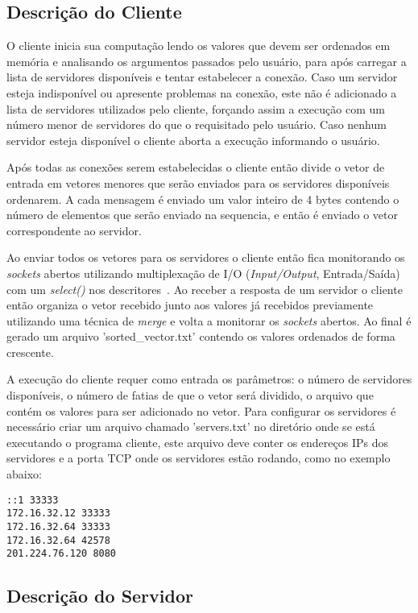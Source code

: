 \documentclass[portuguese, conference]{IEEEtran}
\begin{document}
\subsection{Descrição do Cliente}

O cliente inicia sua computação lendo os valores que devem ser ordenados em memória e analisando os argumentos passados pelo usuário, para após carregar a lista de servidores disponíveis e tentar estabelecer a conexão. Caso um servidor esteja indisponível ou apresente problemas na conexão, este não é adicionado a lista de servidores utilizados pelo cliente, forçando assim a execução com um número menor de servidores do que o requisitado pelo usuário. Caso nenhum servidor esteja disponível o cliente aborta a execução informando o usuário.

Após todas as conexões serem estabelecidas o cliente então divide o vetor de entrada em vetores menores que serão enviados para os servidores disponíveis ordenarem. A cada mensagem é enviado um valor inteiro de 4 bytes contendo o número de elementos que serão enviado na sequencia, e então é enviado o vetor correspondente ao servidor.

Ao enviar todos os vetores para os servidores o cliente então fica monitorando os \textit{sockets} abertos utilizando multiplexação de I/O (\textit{Input/Output}, Entrada/Saída) com um \textit{select()} nos descritores~\cite{IBM15}. Ao receber a resposta de um servidor o cliente então organiza o vetor recebido junto aos valores já recebidos previamente utilizando uma técnica de \textit{merge} e volta a monitorar os \textit{sockets} abertos. Ao final é gerado um arquivo 'sorted\_vector.txt' contendo os valores ordenados de forma crescente.

A execução do cliente requer como entrada os parâmetros: o número de servidores disponíveis, o número de fatias de que o vetor será dividido, o arquivo que contém os valores para ser adicionado no vetor. Para configurar os servidores é necessário criar um arquivo chamado 'servers.txt' no diretório onde se está executando o programa cliente, este arquivo deve conter os endereços IPs dos servidores e a porta TCP onde os servidores estão rodando, como no exemplo abaixo:

\begin{verbatim}
::1 33333
172.16.32.12 33333
172.16.32.64 33333
172.16.32.64 42578
201.224.76.120 8080
\end{verbatim}

\subsection{Descrição do Servidor}
\end{document}

